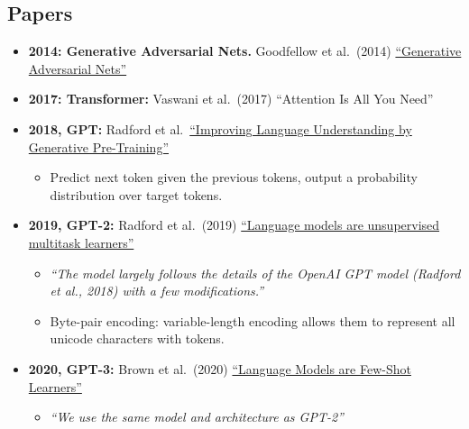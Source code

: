\documentclass[
  11pt,
  letterpaper,
  DIV=11,
  numbers=noendperiod,
  oneside]{scrartcl}
\providecommand{\tightlist}{%
  \setlength{\itemsep}{0pt}\setlength{\parskip}{0pt}}\usepackage{longtable,booktabs,array}
\begin{document}
\hypertarget{papers}{%
\subsection{Papers}\label{papers}}

\begin{itemize}
\item
  \textbf{2014: Generative Adversarial Nets.} Goodfellow et al.~(2014)
  \href{https://proceedings.neurips.cc/paper_files/paper/2014/file/5ca3e9b122f61f8f06494c97b1afccf3-Paper.pdf}{``Generative
  Adversarial Nets''}
\item
  \textbf{2017: Transformer:} Vaswani et al.~(2017) ``Attention Is All
  You Need''
\item
  \textbf{2018, GPT:} Radford et
  al.~\href{https://cdn.openai.com/research-covers/language-unsupervised/language_understanding_paper.pdf}{``Improving
  Language Understanding by Generative Pre-Training''}

  \begin{itemize}
  \tightlist
  \item
    Predict next token given the previous tokens, output a probability
    distribution over target tokens.
  \end{itemize}
\item
  \textbf{2019, GPT-2:} Radford et al.~(2019)
  \href{https://d4mucfpksywv.cloudfront.net/better-language-models/language-models.pdf}{``Language
  models are unsupervised multitask learners''}

  \begin{itemize}
  \tightlist
  \item
    \emph{``The model largely follows the details of the OpenAI GPT
    model (Radford et al., 2018) with a few modifications.''}
  \item
    Byte-pair encoding: variable-length encoding allows them to
    represent all unicode characters with tokens.
  \end{itemize}
\item
  \textbf{2020, GPT-3:} Brown et al.~(2020)
  \href{https://arxiv.org/pdf/2005.14165.pdf}{``Language Models are
  Few-Shot Learners''}

  \begin{itemize}
  \tightlist
  \item
    \emph{``We use the same model and architecture as GPT-2''}
  \end{itemize}


\end{itemize}
\end{document}
